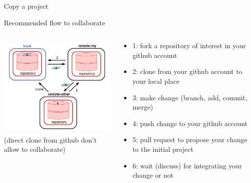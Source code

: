 \begin{frame}{ Copy a project}
\begin{block}{Recommended flow to collaborate}
\begin{columns}
\begin{column}{0.46\textwidth}
\begin{center}
    \includegraphics[height=5cm]{05_history/Images/FAIR_githubWFmaj.png}\\
    \small{(direct clone from github don't allow to collaborate)}
\end{center}
\end{column}
\begin{column}{0.5\textwidth}
\begin{itemize}
    \item 1: fork a repository of interest in your github account 
    \item 2: clone from your github account to your local place
    \item 3: make change (branch, add, commit, merge)
    \item 4: push change to your github account
    \item 5: pull request to propose your change to the initial project
    \item 6: wait (discuss) for integrating your change or not
\end{itemize}
\end{column}
\end{columns}
\end{block}
\end{frame}

